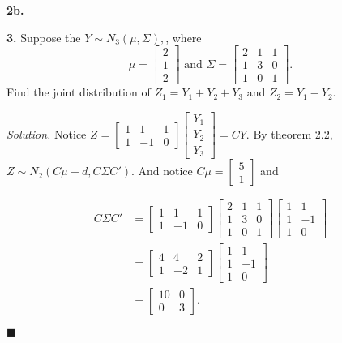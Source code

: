 \documentclass{article}
\begin{document}
\setlength{\parindent}{0cm}   %



\textbf{2b.} 

\textbf{3. } Suppose the \(Y   \sim N_3(\mu, \Sigma), \), where 
\[
\mu=\begin{bmatrix}
2\\1\\2
\end{bmatrix}
\text{         and           } 
\Sigma = \begin{bmatrix}
2 & 1 & 1 \\ 
1 & 3 &0 \\
1 & 0 & 1
\end{bmatrix}.
\]
Find the joint distribution of \(Z_1 = Y_1 + Y_2 + Y_3 \) and \(Z_2 = Y_1-Y_2\). 

\vspace{4mm}
\textit{Solution. } 
Notice \( Z = \begin{bmatrix}
1&1&1\\
1&-1&0 
\end{bmatrix}\begin{bmatrix}
Y_1\\
Y_2\\
Y_3
\end{bmatrix}=CY
\).
By theorem 2.2, \(Z \sim N_2(C\mu+d, C\Sigma C')\).  And notice \(C\mu=\begin{bmatrix}
5\\
1
\end{bmatrix}\) and 

\begin{align*}
C\Sigma C' &= \begin{bmatrix}
1&1&1\\
1&-1&0 
\end{bmatrix} \begin{bmatrix}
2 & 1 & 1 \\ 
1 & 3 &0 \\
1 & 0 & 1
\end{bmatrix}
\begin{bmatrix}
1&1\\
1& -1\\
1&0
\end{bmatrix}\\
&= \begin{bmatrix}
4& 4& 2\\
1 & -2 & 1 
\end{bmatrix}\begin{bmatrix}
1&1\\
1&-1\\
1&0
\end{bmatrix}\\
&= \begin{bmatrix}
10 & 0\\
0 & 3
\end{bmatrix}.
\end{align*}
\begin{flushright}
\(\blacksquare\)
\end{flushright} 
\end{document}
